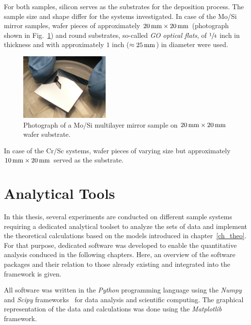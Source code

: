 For both samples, silicon serves as the substrates for the deposition process. The sample size and shape differ for the systems investigated. In case of the Mo/Si mirror samples, wafer pieces of approximately $\mm{20} \times \mm{20}$ (photograph shown in Fig.~\ref{ch_exp:fig_mosi_sample}) and round substrates, so-called \emph{GO optical flats}, of $\sfrac{1}{4}$ inch in thickness and with approximately $1$ inch ($\approx \mm{25}$) in diameter were used.
\begin{figure}[htb]
        \includegraphics[width=0.4\textwidth]{img/SAM_1910_v1}
        \caption[Mo/Si multilayer sample.]{%
            Photograph of a Mo/Si multilayer mirror sample on $\mm{20} \times \mm{20}$ wafer substrate.}
        \label{ch_exp:fig_mosi_sample}
\end{figure}
In case of the Cr/Sc systems, wafer pieces of varying size but approximately $\mm{10} \times \mm{20}$ served as the substrate.

\section{Analytical Tools}
In this thesis, several experiments are conducted on different sample systems requiring a dedicated analytical toolset to analyze the sets of data and implement the theoretical calculations based on the models introduced in chapter~\ref{ch_theo}. For that purpose, dedicated software was developed to enable the quantitative analysis conduced in the following chapters. Here, an overview of the software packages and their relation to those already existing and integrated into the framework is given.

All software was written in the \emph{Python} programming language using the \emph{Numpy} and \emph{Scipy} frameworks~\cite{walt_numpy_2011} for data analysis and scientific computing. The graphical representation of the data and calculations was done using the \emph{Matplotlib}~\cite{hunter_matplotlib:_2007} framework.

